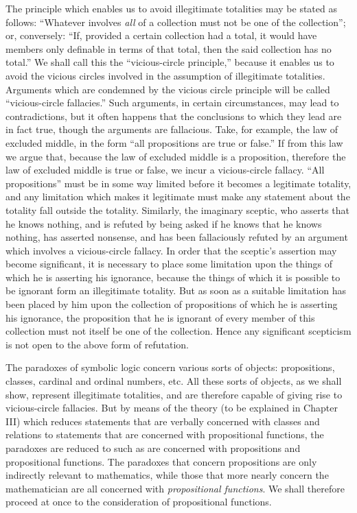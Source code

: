 \documentclass[letterpaper,12pt,openany,leqno]{book}
\newcommand{\pagefirst}[1]{\marginnote[\boxed{\text{#1}}]{\boxed{\text{#1}}}}
\begin{document}
\pagefirst{40} The principle which enables us to avoid illegitimate totalities may be stated as follows: ``Whatever involves \textit{all} of a collection must not be one of the collection''; or, conversely: ``If, provided a certain collection had a total, it would have members only definable in terms of that total, then the said collection has no total.'' We shall call this the ``vicious-circle principle,'' because it enables us to avoid the vicious circles involved in the assumption of illegitimate totalities. Arguments which are condemned by the vicious circle principle will be called ``vicious-circle fallacies.'' Such arguments, in certain circumstances, may lead to contradictions, but it often happens that the conclusions to which they lead are in fact true, though the arguments are fallacious. Take, for example, the law of excluded middle, in the form ``all propositions are true or false.'' If from this law we argue that, because the law of excluded middle is a proposition, therefore the law of excluded middle is true or false, we incur a vicious-circle fallacy. ``All propositions'' must be in some way limited before it becomes a legitimate totality, and any limitation which makes it legitimate must make any statement about the totality fall outside the totality. Similarly, the imaginary sceptic, who asserts that he knows nothing, and is refuted by being asked if he knows that he knows nothing, has asserted nonsense, and has been fallaciously refuted by an argument which involves a vicious-circle fallacy. In order that the sceptic's assertion may become significant, it is necessary to place some limitation upon the things of which he is asserting his ignorance, because the things of which it is possible to be ignorant form an illegitimate totality. But as soon as a suitable limitation has been placed by him upon the collection of propositions of which he is asserting his ignorance, the proposition that he is ignorant of every member of this collection must not itself be one of the collection. Hence any significant scepticism is not open to the above form of refutation.

The paradoxes of symbolic logic concern various sorts of objects: propositions, classes, cardinal and ordinal numbers, etc. All these sorts of objects, as we shall show, represent illegitimate totalities, and are therefore capable of giving rise to vicious-circle fallacies. But by means of the theory (to be explained in Chapter III) which reduces statements that are verbally concerned with classes and relations to statements that are concerned with propositional functions, the paradoxes are reduced to such as are concerned with propositions and propositional functions. The paradoxes that concern propositions are only indirectly relevant to mathematics, while those that more nearly concern the mathematician are all concerned with \textit{propositional functions}. We shall therefore proceed at once to the consideration of propositional functions.
\end{document}
